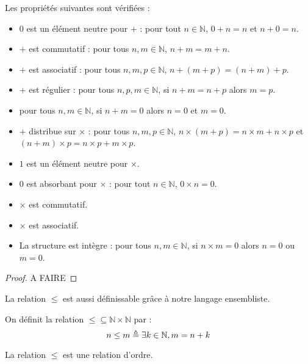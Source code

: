 \begin{property}
  Les propriétés suivantes sont vérifiées :
  \begin{itemize}
  \item $0$ est un élément neutre pour $+$ : pour tout $n\in \mathbb N$,
    $0 + n = n$ et $n + 0 = n$.
  \item $+$ est commutatif : pour tous $n,m\in\mathbb N$, $n+m=m+n$.
  \item $+$ est associatif : pour tous $n,m,p\in\mathbb N$,
    $n+(m+p) = (n+m)+p$.
  \item $+$ est régulier : pour tous $n,p,m\in\mathbb N$, si $n+m = n+p$ alors
    $m=p$.
  \item pour tous $n,m\in \mathbb N$, si $n + m = 0$ alors $n=0$ et $m = 0$.
  \item $+$ distribue sur $\times$ : pour tous $n,m,p\in\mathbb N$,
    $n\times(m+p) = n\times m + n \times p$ et
    $(n+m)\times p = n\times p + m \times p$.
  \item $1$ est un élément neutre pour $\times$.
  \item $0$ est absorbant pour $\times$ : pour tout $n\in \mathbb N$,
    $0\times n = 0$.
  \item $\times$ est commutatif.
  \item $\times$ est associatif.
  \item La structure est intègre : pour tous $n,m\in \mathbb N$, si
    $n\times m = 0$ alors $n = 0$ ou $m = 0$.
  \end{itemize}
\end{property}

\begin{proof}
  A FAIRE
\end{proof}

La relation $\leq$ est aussi définissable grâce à notre langage ensembliste.

\begin{definition}[Inégalité]
  On définit la relation $\leq\subseteq \mathbb N \times \mathbb N$ par :
  \[n \leq m \triangleq \exists k \in \mathbb N, m = n + k\]
\end{definition}

\begin{property}
  La relation $\leq$ est une relation d'ordre.
\end{property}

